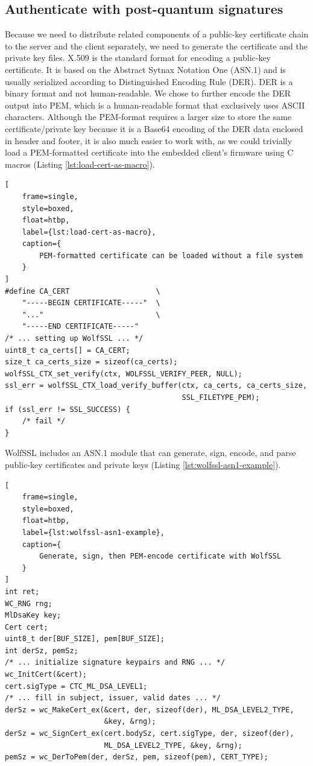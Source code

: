 \documentclass[letterpaper,12pt,titlepage,oneside,final]{book}
\begin{document}
\subsection{Authenticate with post-quantum signatures}\label{sec:authenticate-with-pq-sig}
Because we need to distribute related components of a public-key certificate chain to the server and the client separately, we need to generate the certificate and the private key files.
X.509 is the standard format for encoding a public-key certificate.
It is based on the Abstract Sytnax Notation One (ASN.1) and is usually serialized according to Distinguished Encoding Rule (DER).
DER is a binary format and not human-readable.
We chose to further encode the DER output into PEM, which is a human-readable format that exclusively uses ASCII characters.
Although the PEM-format requires a larger size to store the same certificate/private key because it is a Base64 encoding of the DER data enclosed in header and footer, it is also much easier to work with, as we could trivially load a PEM-formatted certificate into the embedded client's firmware using C macros (Listing \ref{lst:load-cert-as-macro}).

\begin{lstlisting}[
    frame=single, 
    style=boxed, 
    float=htbp,
    label={lst:load-cert-as-macro}, 
    caption={
        PEM-formatted certificate can be loaded without a file system
    }
]
#define CA_CERT                    \
    "-----BEGIN CERTIFICATE-----"  \
    "..."                          \
    "-----END CERTIFICATE-----"
/* ... setting up WolfSSL ... */
uint8_t ca_certs[] = CA_CERT;
size_t ca_certs_size = sizeof(ca_certs);
wolfSSL_CTX_set_verify(ctx, WOLFSSL_VERIFY_PEER, NULL);
ssl_err = wolfSSL_CTX_load_verify_buffer(ctx, ca_certs, ca_certs_size,
                                         SSL_FILETYPE_PEM);
if (ssl_err != SSL_SUCCESS) {
    /* fail */
}
\end{lstlisting}

WolfSSL includes an ASN.1 module that can generate, sign, encode, and parse public-key certificates and private keys (Listing \ref{lst:wolfssl-asn1-example}).

\begin{lstlisting}[
    frame=single, 
    style=boxed, 
    float=htbp,
    label={lst:wolfssl-asn1-example}, 
    caption={
        Generate, sign, then PEM-encode certificate with WolfSSL
    }
]
int ret;
WC_RNG rng;
MlDsaKey key;
Cert cert;
uint8_t der[BUF_SIZE], pem[BUF_SIZE];
int derSz, pemSz;
/* ... initialize signature keypairs and RNG ... */
wc_InitCert(&cert);
cert.sigType = CTC_ML_DSA_LEVEL1;
/* ... fill in subject, issuer, valid dates ... */
derSz = wc_MakeCert_ex(&cert, der, sizeof(der), ML_DSA_LEVEL2_TYPE, 
                       &key, &rng);
derSz = wc_SignCert_ex(cert.bodySz, cert.sigType, der, sizeof(der), 
                       ML_DSA_LEVEL2_TYPE, &key, &rng);
pemSz = wc_DerToPem(der, derSz, pem, sizeof(pem), CERT_TYPE);
\end{lstlisting}
\end{document}
